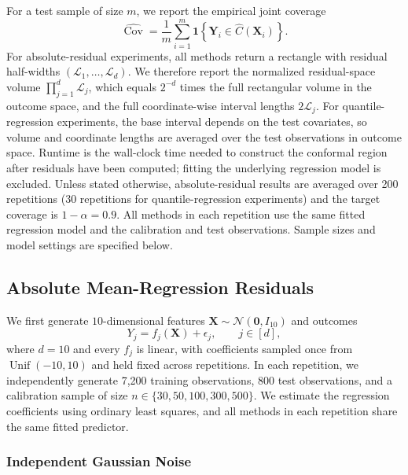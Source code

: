 For a test sample of size $m$, we report the empirical joint coverage
\[
  \widehat{\operatorname{Cov}}
  = \frac{1}{m}\sum_{i=1}^{m}
    \mathbf{1}\!\left\{\boldsymbol{Y}_i
    \in \widehat{C}(\boldsymbol{X}_i)\right\}.
\]
For absolute-residual experiments, all methods return a rectangle with residual
half-widths $(\mathcal{L}_1,\ldots,\mathcal{L}_d)$. We therefore report the normalized
residual-space volume $\prod_{j=1}^{d}\mathcal{L}_j$, which equals $2^{-d}$ times the
full rectangular volume in the outcome space, and the full coordinate-wise interval lengths
$2\mathcal{L}_j$. For quantile-regression experiments, the base interval
depends on the test covariates, so volume and coordinate lengths are
averaged over the test observations in outcome space. Runtime is
the wall-clock time needed to construct the conformal region after residuals
have been computed; fitting the underlying regression model is excluded. Unless
stated otherwise, absolute-residual results are averaged over 200 repetitions (30 repetitions for quantile-regression experiments)
and the target coverage is $1-\alpha=0.9$. All methods in each repetition use
the same fitted regression model and the calibration and test observations.
Sample sizes and model settings are specified below. 

\subsection{Absolute Mean-Regression Residuals}
\label{sec:absolute-residual-experiments}

We first generate $10$-dimensional features
$\boldsymbol{X}\sim\mathcal{N}(\boldsymbol{0},I_{10})$ and outcomes
\begin{equation}
  Y_j=f_j(\boldsymbol X)+\epsilon_j,\qquad j\in[d],
  \label{eq:data-generator}
\end{equation}
where $d=10$ and every $f_j$ is linear, with coefficients sampled once
from $\operatorname{Unif}(-10,10)$ and held fixed across repetitions.
In each repetition, we independently generate 7,200 training observations,
800 test observations, and a calibration sample of size $n\in\{30,50,100,300,500\}$. We
estimate the regression coefficients using
ordinary least squares, and all methods in each repetition share the same fitted predictor. 

\subsubsection{Independent Gaussian Noise}

